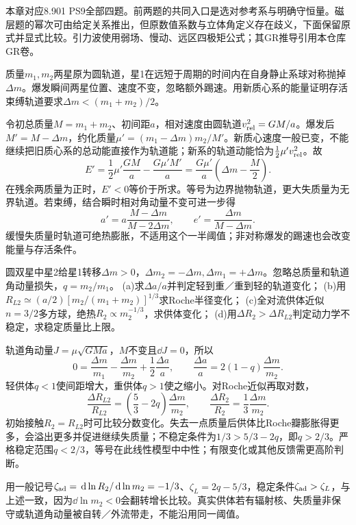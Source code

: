 本章对应8.901 PS9全部四题。前两题的共同入口是选对参考系与明确守恒量。磁层题的幂次可由给定关系推出，但原数值系数与立体角定义存在歧义，下面保留原式并显式比较。引力波使用弱场、慢动、远区四极矩公式；其GR推导引用本仓库GR卷。

\begin{exercise}
质量$m_1,m_2$两星原为圆轨道，星1在远短于周期的时间内在自身静止系球对称抛掉$\Delta m$。爆发瞬间两星位置、速度不变，忽略额外踢速。用新质心系的能量证明存活束缚轨道要求$\Delta m<(m_1+m_2)/2$。
\end{exercise}
\begin{solution}
令初总质量$M=m_1+m_2$、初间距$a$，相对速度由圆轨道$v_{\rm rel}^2=GM/a$。爆发后$M'=M-\Delta m$，约化质量$\mu'=(m_1-\Delta m)m_2/M'$。新质心速度一般已变，不能继续把旧质心系的总动能直接作为轨道能；新系的轨道动能恰为$\tfrac12\mu'v_{\rm rel}^2$。故
\[
 E'=\frac12\mu'\frac{GM}{a}-\frac{G\mu'M'}a
 =\frac{G\mu'}a\left(\Delta m-\frac M2\right).
\]
在残余两质量为正时，$E'<0$等价于所求。等号为边界抛物轨道，更大失质量为无界轨道。若束缚，结合瞬时相对角动量不变可进一步得
\[
 a'=a\frac{M-\Delta m}{M-2\Delta m},\qquad
 e'=\frac{\Delta m}{M-\Delta m}.
\]
缓慢失质量时轨道可绝热膨胀，不适用这个一半阈值；非对称爆发的踢速也会改变能量与存活条件。
\end{solution}

\begin{exercise}
圆双星中星2给星1转移$\Delta m>0$，$\Delta m_2=-\Delta m,\Delta m_1=+\Delta m$。忽略总质量和轨道角动量损失，$q=m_2/m_1$。
(a)求$\Delta a/a$并判定轻到重／重到轻的轨道变化；
(b)用$R_{L2}\simeq(a/2)[m_2/(m_1+m_2)]^{1/3}$求Roche半径变化；
(c)全对流供体近似$n=3/2$多方球，绝热$R_2\propto m_2^{-1/3}$，求供体变化；
(d)用$\Delta R_2>\Delta R_{L2}$判定动力学不稳定，求稳定质量比上限。
\end{exercise}
\begin{solution}
轨道角动量$J=\mu\sqrt{GMa}$，$M$不变且$\dd J=0$，所以
\[
 0=\frac{\Delta m}{m_1}-\frac{\Delta m}{m_2}+\frac12\frac{\Delta a}{a},
 \qquad
 \frac{\Delta a}{a}=2(1-q)\frac{\Delta m}{m_2}.
\]
轻供体$q<1$使间距增大，重供体$q>1$使之缩小。对Roche近似再取对数，
\[
 \frac{\Delta R_{L2}}{R_{L2}}
 =\left(\frac53-2q\right)\frac{\Delta m}{m_2},\qquad
 \frac{\Delta R_2}{R_2}=\frac13\frac{\Delta m}{m_2}.
\]
初始接触$R_2=R_{L2}$时可比较分数变化。失去一点质量后供体比Roche瓣膨胀得更多，会溢出更多并促进继续失质量；不稳定条件为$1/3>5/3-2q$，即$q>2/3$。严格稳定范围$q<2/3$，等号在此线性模型中中性；有限变化或其他反馈需更高阶判断。

用一般记号$\zeta_{\rm ad}=\,\mathrm d\ln R_2/\,\mathrm d\ln m_2=-1/3$、$\zeta_L=2q-5/3$，稳定条件$\zeta_{\rm ad}>\zeta_L$，与上述一致，因为$\dd\ln m_2<0$会翻转增长比较。真实供体若有辐射核、失质量非保守或轨道角动量被自转／外流带走，不能沿用同一阈值。
\end{solution}

